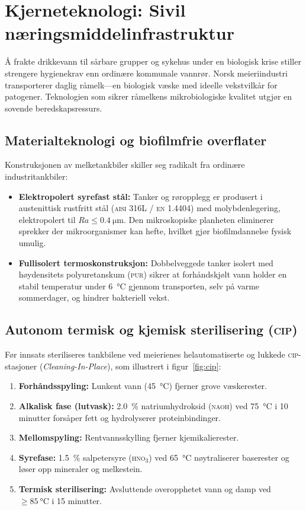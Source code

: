 \section{Kjerneteknologi: Sivil næringsmiddelinfrastruktur}
\label{sec:kjerneteknologi}

Å frakte drikkevann til sårbare grupper og sykehus under en biologisk krise stiller strengere hygienekrav enn ordinære kommunale vannrør. Norsk meieriindustri transporterer daglig råmelk---en biologisk væske med ideelle vekstvilkår for patogener. Teknologien som sikrer råmelkens mikrobiologiske kvalitet utgjør en sovende beredskapsressurs.

\subsection{Materialteknologi og biofilmfrie overflater}
Konstruksjonen av melketankbiler skiller seg radikalt fra ordinære industritankbiler:
\begin{itemize}[leftmargin=1.5em, itemsep=0.2em]
    \item \textbf{Elektropolert syrefast stål:} Tanker og røropplegg er produsert i austenittisk rustfritt stål (\textsc{aisi} 316L / \textsc{en} 1.4404) med molybdenlegering, elektropolert til $Ra \le \SI{0.4}{\micro\meter}$. Den mikroskopiske planheten eliminerer sprekker der mikroorganismer kan hefte, hvilket gjør biofilmdannelse fysisk umulig.
    \item \textbf{Fullisolert termoskonstruksjon:} Dobbelveggede tanker isolert med høydensitets polyuretanskum (\textsc{pur}) sikrer at forhåndskjølt vann holder en stabil temperatur under \SI{6}{\celsius} gjennom transporten, selv på varme sommerdager, og hindrer bakteriell vekst.
\end{itemize}

\subsection{Autonom termisk og kjemisk sterilisering (\textsc{cip})}
Før innsats steriliseres tankbilene ved meierienes helautomatiserte og lukkede \textsc{cip}-stasjoner (\textit{Cleaning-In-Place}), som illustrert i figur~\ref{fig:cip}:
\begin{enumerate}[leftmargin=1.5em, itemsep=0.15em]
    \item \textbf{Forhåndsspyling:} Lunkent vann (\SI{45}{\celsius}) fjerner grove væskerester.
    \item \textbf{Alkalisk fase (lutvask):} \SI{2.0}{\percent} natriumhydroksid (\textsc{naoh}) ved \SI{75}{\celsius} i 10 minutter forsåper fett og hydrolyserer proteinbindinger.
    \item \textbf{Mellomspyling:} Rentvannsskylling fjerner kjemikalierester.
    \item \textbf{Syrefase:} \SI{1.5}{\percent} salpetersyre (\textsc{hno}$_3$) ved \SI{65}{\celsius} nøytraliserer baserester og løser opp mineraler og melkestein.
    \item \textbf{Termisk sterilisering:} Avsluttende overopphetet vann og damp ved $\ge \SI{85}{\celsius}$ i 15 minutter.
\end{enumerate}

